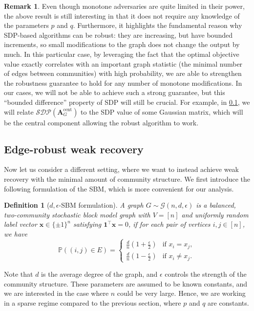 \documentclass[11pt, titlepage]{article} %
\numberwithin{equation}{section}
\newtheorem{definition}{Definition}
\theoremstyle{definition}
\newtheorem{remark}{Remark}
\numberwithin{theorem}{section}
\numberwithin{lemma}{section}
\numberwithin{corollary}{section}
\numberwithin{proposition}{section}
\numberwithin{definition}{section}
\numberwithin{remark}{section}
\begin{document}
\begin{remark}
Even though monotone adversaries are quite limited in their power, the above result is still
interesting in that it does not require any knowledge of the parameters $p$ and $q$. Furthermore,
it highlights the fundamental reason why SDP-based algorithms can be robust: they are increasing, 
but have bounded increments, so small modifications to the graph does not change the output by much.
In this particular case, by leveraging the fact that the optimal objective value exactly correlates
with an important graph statistic (the minimal number of edges between communities) with high probability,
we are able to strengthen the robustness guarantee to hold for any number of monotone modifications.
In our cases, we will not be able to achieve such a strong guarantee, but this ``bounded difference''
property of SDP will still be crucial. For example, in \cref{sec:MS16}, we will relate 
$\mathcal{SDP}(\bm{A}_G^\text{cent})$ to the SDP value of some Gaussian matrix, which will be the
central component allowing the robust algorithm to work.
\end{remark}

\subsection{Edge-robust weak recovery}
\label{sec:MS16}
Now let us consider a different setting, where we want to instead achieve weak recovery with the
minimal amount of community structure. We first introduce the following formulation of the SBM, 
which is more convenient for our analysis.
\begin{definition}[$d,\epsilon$-SBM formulation]
A graph $G \sim \mathcal{G}(n, d, \epsilon)$ is a balanced, two-community stochastic block model graph
with $V = [n]$ and uniformly random label vector $\bm{x} \in \{\pm 1\}^n$ satisfying $\bm{1}^\top \bm{x} = 0$,
if for each pair of vertices $i, j \in [n]$, we have
\[\mathbb{P}((i,j) \in E) = \begin{cases}
\frac{d}{n}(1+\frac{\epsilon}{2}) & \text{if } x_i = x_j, \\
\frac{d}{n}(1-\frac{\epsilon}{2}) & \text{if } x_i \neq x_j.
\end{cases}\] 
\end{definition}
Note that $d$ is the average degree of the graph, and $\epsilon$ controls the strength of the community structure.
These parameters are assumed to be known constants, and we are interested in the case where $n$ could
be very large. Hence, we are working in a sparse regime compared to the previous section, 
where $p$ and $q$ are constants. 
\end{document}
